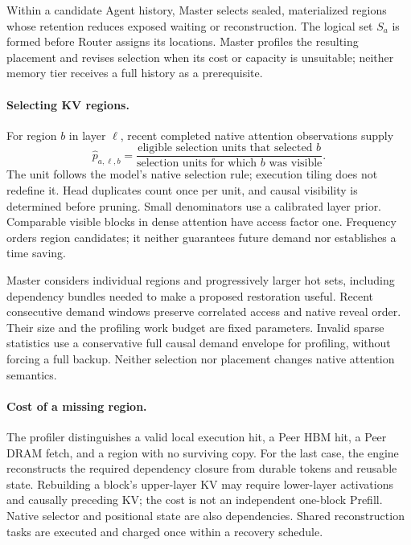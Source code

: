 Within a candidate Agent history, Master selects sealed, materialized
regions whose retention reduces exposed waiting or reconstruction.
The logical set $S_a$ is formed before Router assigns its locations.
Master profiles the resulting placement and revises selection when its
cost or capacity is unsuitable; neither memory tier receives a full
history as a prerequisite.

\paragraph{Selecting KV regions.}
For region $b$ in layer $\ell$, recent completed native attention
observations supply
\begin{equation}
 \widehat p_{a,\ell,b}=
 \frac{\text{eligible selection units that selected }b}
      {\text{selection units for which }b\text{ was visible}}.
 \label{eq:teacher-demand}
\end{equation}
The unit follows the model's native selection rule; execution tiling
does not redefine it. Head duplicates count once per unit, and causal
visibility is determined before pruning. Small denominators use a
calibrated layer prior. Comparable visible blocks in dense attention
have access factor one. Frequency orders region candidates; it neither
guarantees future demand nor establishes a time saving.

Master considers individual regions and progressively larger hot sets,
including dependency bundles needed to make a proposed restoration
useful. Recent consecutive demand windows preserve correlated access
and native reveal order. Their size and the profiling work budget are
fixed parameters. Invalid sparse statistics use a conservative full
causal demand envelope for profiling, without forcing a full backup.
Neither selection nor placement changes native attention semantics.

\paragraph{Cost of a missing region.}
The profiler distinguishes a valid local execution hit, a Peer HBM hit, a
Peer DRAM fetch, and a region with no surviving copy. For the last case,
the engine reconstructs the required dependency closure from durable
tokens and reusable state. Rebuilding a block's upper-layer KV may
require lower-layer activations and causally preceding KV; the cost is
not an independent one-block Prefill. Native selector and positional
state are also dependencies. Shared reconstruction tasks are executed
and charged once within a recovery schedule.

